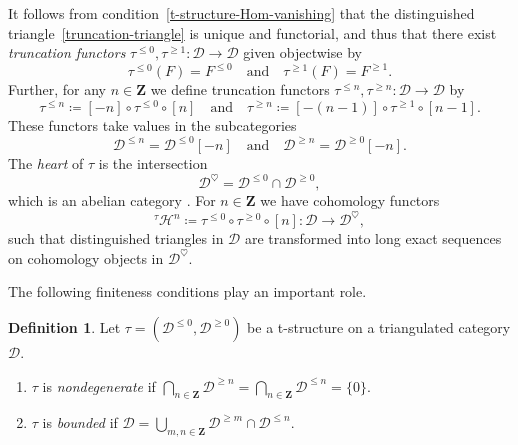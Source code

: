 \documentclass[11pt, reqno]{amsart}
\numberwithin{equation}{section}
\theoremstyle{plain}
\theoremstyle{remark}
\theoremstyle{definition}
\newtheorem{definition}[theorem]{Definition}
\theoremstyle{italicsname}
\newcommand{\cH}{\mathcal{H}}
\newcommand{\cD}{\mathscr{D}}
\newcommand{\bZ}{\mathbf{Z}}
\begin{document}
It follows from condition~\eqref{t-structure-Hom-vanishing} that the distinguished triangle~\eqref{truncation-triangle} is unique and functorial, and thus that there exist \emph{truncation functors} $\tau^{\leqslant 0} , \tau^{\geqslant 1} \colon \cD \to \cD$ given objectwise by 
\begin{equation*}
\tau^{\leqslant 0}(F) = F^{\leqslant 0} \quad \text{and} \quad 
\tau^{\geqslant 1}(F) = F^{\geqslant 1}. 
\end{equation*}
Further, for any $n \in \bZ$ we define truncation functors $\tau^{\leqslant n}, \tau^{\geqslant n} \colon \cD \to \cD$ by 
\begin{equation*}
    \tau^{\leqslant n} \coloneqq [-n] \circ \tau^{\leqslant 0} \circ [n] \quad \text{and} 
    \quad 
    \tau^{\geqslant n} \coloneqq [-(n-1)] \circ \tau^{\geqslant 1} \circ [n-1]. 
\end{equation*}
These functors take values in the subcategories 
\begin{equation*}
    \cD^{\leqslant n} = \cD^{\leqslant 0}[-n] \quad \text{and} \quad 
    \cD^{\geqslant n} = \cD^{\geqslant 0}[-n]. 
\end{equation*}
The \emph{heart} of $\tau$ is the intersection 
\begin{equation*}
    \cD^{\heartsuit} = \cD^{\leqslant 0} \cap \cD^{\geqslant 0}, 
\end{equation*}
which is an abelian category \cite{BBDG}. 
For $n \in \bZ$ we have cohomology functors 
\begin{equation*}
    {^\tau}\cH^{n} \coloneqq \tau^{\leqslant 0} \circ \tau^{\geqslant 0} \circ [n] \colon \cD \to \cD^{\heartsuit}, 
\end{equation*}
such that distinguished triangles in $\cD$ are transformed into long exact sequences on cohomology objects in $\cD^{\heartsuit}$. 

The following finiteness conditions play an important role. 
\begin{definition}
    Let $\tau = (\cD^{\leqslant 0}, \cD^{\geqslant 0})$ be a t-structure on a triangulated category $\cD$. 
    \begin{enumerate}
    \item $\tau$ is \emph{nondegenerate} if $\bigcap_{n\in\bZ}\cD^{\geqslant n}= \bigcap_{n\in\bZ}\cD^{\leqslant n}=\{0\}$. 
    \item $\tau$ is \emph{bounded} if $\cD = \bigcup_{m,n \in \bZ} \cD^{\geqslant m} \cap \cD^{\leqslant n}$. 
    \end{enumerate}
\end{definition}
\end{document}
